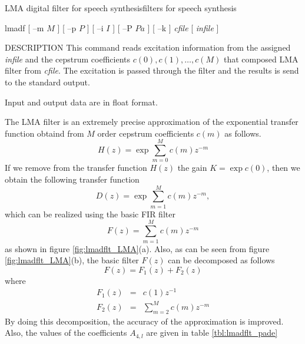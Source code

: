 %
{LMA digital filter for speech synthesis}{filters for speech synthesis}

\begin{synopsis}
\item [lmadf] [ --m $M$ ] [ --p $P$ ] [ --i $I$ ] [ --P $Pa$ ] [ --k ] 
      {\em cfile} [ {\em infile} ]
\end{synopsis}

\begin{qsection}{DESCRIPTION}
This command reads excitation information from the assigned
{\em infile} and the cepstrum coefficients $c(0),c(1),\ldots,c(M)$
that composed LMA filter from {\em cfile}. 
The excitation is passed through the filter and
the results is send to the standard output.
\par
Input and output data are in float format.
\par
The LMA filter is an extremely precise approximation of the
exponential transfer function obtaind from $M$ order cepstrum
coefficients $c(m)$ as follows.
\begin{displaymath}
H(z) = \exp \sum_{m=0}^{M} c(m) z^{-m}
\end{displaymath}
If we remove from the transfer function $H(z)$ the gain
$K=\exp c(0)$, then we obtain the following transfer function
\begin{displaymath}
D(z) = \exp \sum_{m=1}^{M} c(m) z^{-m},
\end{displaymath}
which can be realized using the basic FIR filter
\begin{displaymath}
F(z) = \sum_{m=1}^{M} c(m) z^{-m}
\end{displaymath}
as shown in figure \ref{fig:lmadflt_LMA}(a).
Also, as can be seen from figure \ref{fig:lmadflt_LMA}(b),
the basic filter $F(z)$ can be decomposed as follows
\begin{displaymath}
F(z) = F_1(z) + F_2(z)
\end{displaymath}
where 
\begin{eqnarray*}
F_1(z) &=& c(1) z^{-1} \\
F_2(z) &=& \sum_{m=2}^{M} c(m) z^{-m}
\end{eqnarray*}
By doing this decomposition, the accuracy of the approximation
is improved.
Also, the values of the coefficients $A_{4,l}$ are given
in table \ref{tbl:lmadflt_pade}
\par
\setcounter{figure}{0}
\begin{figure}[ht]
\setlength{\unitlength}{0.9mm}
\begin{center}

\end{center}
\end{figure}
\end{qsection}
